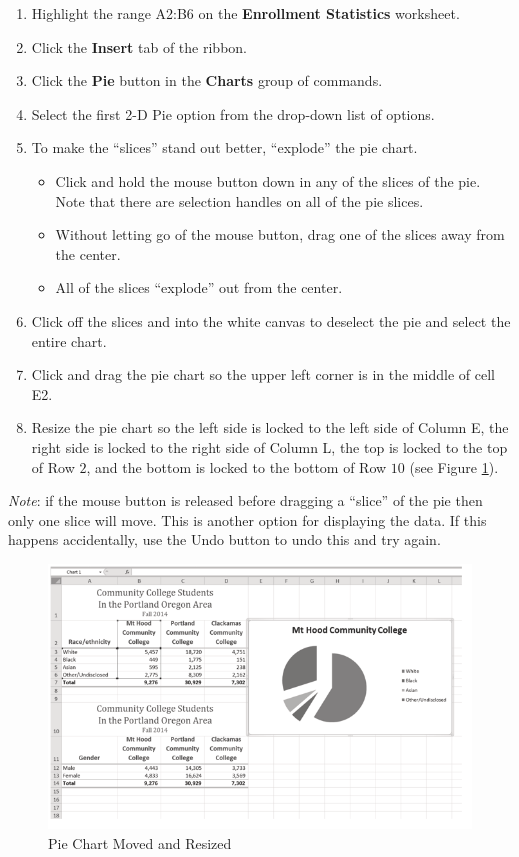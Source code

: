\begin{enumerate}
	\item Highlight the range \textsf{A2:B6} on the \textbf{Enrollment Statistics} worksheet.
	\item Click the \textbf{Insert} tab of the ribbon.
	\item Click the \textbf{Pie} button in the \textbf{Charts} group of commands.
	\item Select the first 2-D Pie option from the drop-down list of options.
	\item To make the ``slices'' stand out better, ``explode'' the pie chart.

	\begin{itemize}
		\item Click and hold the mouse button down in any of the slices of the pie. Note that there are selection handles on all of the pie slices.
		\item Without letting go of the mouse button, drag one of the slices away from the center.
		\item All of the slices ``explode'' out from the center.
	\end{itemize}

	\item Click off the slices and into the white canvas to deselect the pie and select the entire chart.
	\item Click and drag the pie chart so the upper left corner is in the middle of cell E2.
	\item Resize the pie chart so the left side is locked to the left side of Column E, the right side is locked to the right side of Column L, the top is locked to the top of Row $ 2 $, and the bottom is locked to the bottom of Row $ 10 $ (see Figure \ref{04:fig20}).
\end{enumerate}

\textit{Note}: if the mouse button is released before dragging a ``slice'' of the pie then only one slice will move. This is another option for displaying the data. If this happens accidentally, use the Undo button to undo this and try again.

\begin{figure}[H]
	\centering
	\includegraphics[width=\maxwidth{.95\linewidth}]{gfx/ch04_fig20}
	\caption{Pie Chart Moved and Resized}
	\label{04:fig20}
\end{figure}

